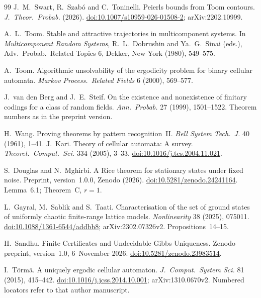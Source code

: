 \begin{thebibliography}{99}
 J.~M.~Swart, R.~Szab\'o and C.~Toninelli. Peierls bounds from Toom contours. \emph{J.\ Theor.\ Probab.} (2026). \href{https://doi.org/10.1007/s10959-026-01508-2}{doi:10.1007/s10959-026-01508-2}; arXiv:2202.10999.

 A.~L.~Toom. Stable and attractive trajectories in multicomponent systems. In \emph{Multicomponent Random Systems}, R.~L.~Dobrushin and Ya.~G.~Sinai (eds.), Adv.\ Probab.\ Related Topics 6, Dekker, New York (1980), 549--575.

 A.~Toom. Algorithmic unsolvability of the ergodicity problem for binary cellular automata. \emph{Markov Process.\ Related Fields} 6 (2000), 569--577.

 J.~van den Berg and J.~E.~Steif. On the existence and nonexistence of finitary codings for a class of random fields. \emph{Ann.\ Probab.} 27 (1999), 1501--1522. Theorem numbers as in the preprint version.

 H.~Wang. Proving theorems by pattern recognition~II. \emph{Bell System Tech.\ J.} 40 (1961), 1--41.
 J.~Kari. Theory of cellular automata: A survey. \emph{Theoret.\ Comput.\ Sci.} 334 (2005), 3--33. \href{https://doi.org/10.1016/j.tcs.2004.11.021}{doi:10.1016/j.tcs.2004.11.021}.


 S.~Douglas and N.~Mghirbi. A Rice theorem for stationary states under fixed noise. Preprint, version~1.0.0, Zenodo (2026). \href{https://doi.org/10.5281/zenodo.24241164}{doi:10.5281/zenodo.24241164}. Lemma~6.1; Theorem~C, $r=1$.

 L.~Gayral, M.~Sablik and S.~Taati. Characterisation of the set of ground states of uniformly chaotic finite-range lattice models. \emph{Nonlinearity} 38 (2025), 075011. \href{https://doi.org/10.1088/1361-6544/addbb8}{doi:10.1088/1361-6544/addbb8}; arXiv:2302.07326v2. Propositions~14--15.

 H.~Sandhu. Finite Certificates and Undecidable Gibbs Uniqueness. Zenodo preprint, version~1.0, 6~November 2026. \href{https://doi.org/10.5281/zenodo.23983514}{doi:10.5281/zenodo.23983514}.

 I.~T\"orm\"a. A uniquely ergodic cellular automaton. \emph{J.\ Comput.\ System Sci.} 81 (2015), 415--442. \href{https://doi.org/10.1016/j.jcss.2014.10.001}{doi:10.1016/j.jcss.2014.10.001}; arXiv:1310.0670v2. Numbered locators refer to that author manuscript.

\end{thebibliography}





